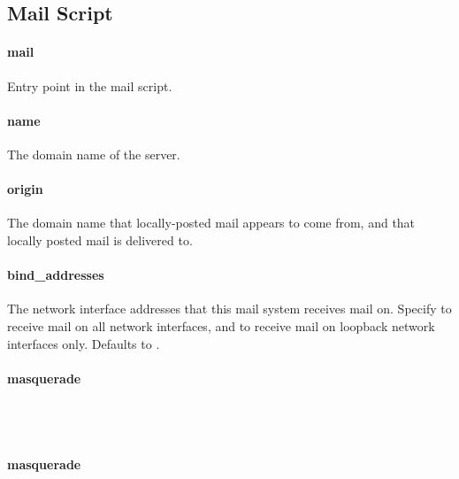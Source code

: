 \subsection{Mail Script}

\paragraph{mail}


Entry point in the mail script.

\paragraph{name}


The domain name of the server.

\paragraph{origin}


The domain name that locally-posted mail appears to come
from, and that locally posted mail is delivered to.

\paragraph{bind\_addresses}


The network interface addresses that this mail system receives mail on.
Specify \literalall{} to receive mail on all network interfaces,
and \literalloopback{} to receive mail on loopback network interfaces only.
Defaults to \literalall.

\paragraph{masquerade}

\\
\\

\paragraph{masquerade}

